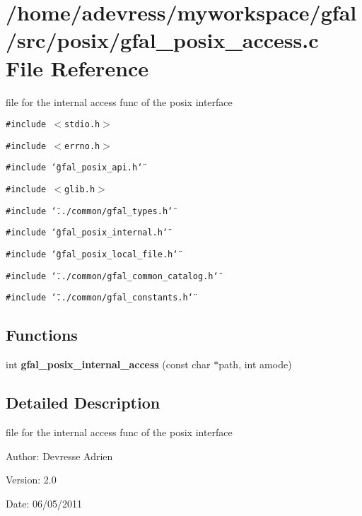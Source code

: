 \section{/home/adevress/myworkspace/gfal/src/posix/gfal\_\-posix\_\-access.c File Reference}
\label{gfal__posix__access_8c}
file for the internal access func of the posix interface 

{\tt \#include $<$stdio.h$>$}\par
{\tt \#include $<$errno.h$>$}\par
{\tt \#include \char`\"{}gfal\_\-posix\_\-api.h\char`\"{}}\par
{\tt \#include $<$glib.h$>$}\par
{\tt \#include \char`\"{}../common/gfal\_\-types.h\char`\"{}}\par
{\tt \#include \char`\"{}gfal\_\-posix\_\-internal.h\char`\"{}}\par
{\tt \#include \char`\"{}gfal\_\-posix\_\-local\_\-file.h\char`\"{}}\par
{\tt \#include \char`\"{}../common/gfal\_\-common\_\-catalog.h\char`\"{}}\par
{\tt \#include \char`\"{}../common/gfal\_\-constants.h\char`\"{}}\par
\subsection*{Functions}
\begin{CompactItemize}
\item 
int \textbf{gfal\_\-posix\_\-internal\_\-access} (const char $\ast$path, int amode)\label{gfal__posix__access_8c_4dd88ccfb2942d117604793819e1f933}

\end{CompactItemize}


\subsection{Detailed Description}
file for the internal access func of the posix interface 

\begin{Desc}
\item[Author:]Devresse Adrien \end{Desc}
\begin{Desc}
\item[Version:]2.0 \end{Desc}
\begin{Desc}
\item[Date:]06/05/2011 \end{Desc}
